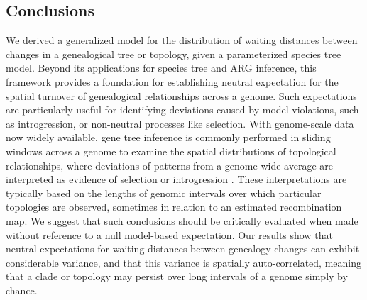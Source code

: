 \documentclass[11pt]{article}
\begin{document}

\subsection{Conclusions}

We derived a generalized model for the distribution of waiting
distances between changes in a genealogical tree or topology, 
given a parameterized species tree model.
% 
Beyond its applications for species tree and ARG inference, 
this framework provides a foundation for establishing neutral 
expectation for the spatial turnover of genealogical 
relationships across a genome.
% 
Such expectations are particularly useful for identifying
deviations caused by model violations, such as introgression,
or non-neutral processes like selection.
% 
With genome-scale data now widely available, gene tree inference
is commonly performed in sliding windows across a genome to examine
the spatial distributions of topological relationships, where
deviations of patterns from a genome-wide average are interpreted
as evidence of selection or introgression
\citep{martin_exploring_2017,zhang2016genome,li2019recombination}.
% 
% 
These interpretations are typically based on the lengths of genomic
intervals over which particular topologies are observed, 
sometimes in relation to an estimated recombination map.
% 
We suggest that such conclusions should be critically evaluated
when made without reference to a null model-based expectation. 
% 
Our results show that neutral expectations for waiting distances between 
genealogy changes can exhibit considerable variance, and that this 
variance is spatially auto-correlated, meaning that a clade or topology
may persist over long intervals of a genome simply by chance.
\end{document}
